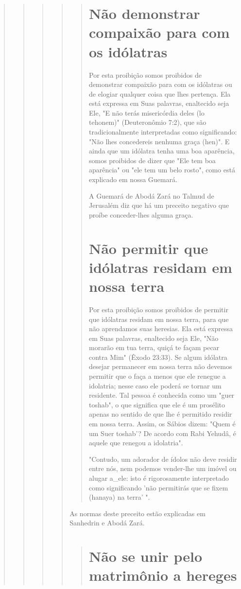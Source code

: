 \begin{quote}
\begin{quote}
\begin{quote}
\begin{quote}
\begin{quote}
\section{Não demonstrar compaixão para com os idólatras}

Por esta proibição somos proibidos de demonstrar compaixão para com os
idólatras ou de elogiar qualquer coisa que lhes pertença. Ela está
ex­pressa em Suas palavras, enaltecido seja Ele, "E não terás
misericórdia deles (lo tehonem)" (Deuteronômio 7:2), que são
tradicionalmente interpretadas co­mo significando: "Não lhes concedereis
nenhuma graça (hen)". E ainda que um idólatra tenha uma boa aparência,
somos proibidos de dizer que "Ele tem boa aparência" ou "ele tem um belo
rosto", como está explicado em nossa Guemará.

A Guemará de Abodá Zará no Talmud de Jerusalém diz que há um preceito
negativo que proíbe conceder-lhes alguma graça.

\section{Não permitir que idólatras residam em nossa terra}

Por esta proibição somos proibidos de permitir que idólatras resi­dam em
nossa terra, para que não aprendamos suas heresias. Ela está expressa em
Suas palavras, enaltecido seja Ele, "Não morarão em tua terra, quiçá te
fa­çam pecar contra Mim" (Êxodo 23:33). Se algum idólatra desejar
permanecer em nossa terra não devemos permitir que o faça a menos que
ele renegue a idolatria; nesse caso ele poderá se tornar um residente.
Tal pessoa é conhecida como um "guer toshab", o que significa que ele é
um prosélito apenas no sen­tido de que lhe é permitido residir em nossa
terra. Assim, os Sábios dizem: "Quem é um Suer toshab'? De acordo com
Rabi Yehudâ, é aquele que rene­gou a idolatria".

"Contudo, um adorador de ídolos não deve residir entre nós, nem podemos
vender-lhe um imóvel ou alugar a\_ele: isto é rigorosamente
interpre­tado como significando 'não permitirás que se fixem (hanaya) na
terra' ".

\end{quote}

As normas deste preceito estão explicadas em Sanhedrin e Abodá Zará.

\begin{quote}
\section{Não se unir pelo matrimônio a hereges}


\end{quote}
\end{quote}
\end{quote}
\end{quote}
\end{quote}
